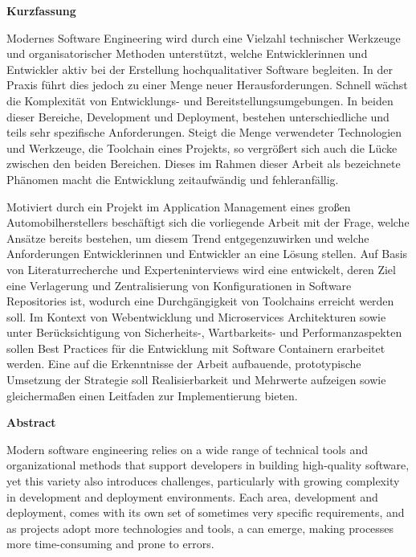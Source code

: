\clearpage

\begin{center}
    {\LARGE\textbf{Kurzfassung}}
\end{center}
\vspace{1em}

Modernes Software Engineering wird durch eine Vielzahl technischer Werkzeuge und organisatorischer Methoden unterstützt, welche Entwicklerinnen und Entwickler aktiv bei der Erstellung hochqualitativer Software begleiten. In der Praxis führt dies jedoch zu einer Menge neuer Herausforderungen. Schnell wächst die Komplexität von Entwicklungs- und Bereitstellungsumgebungen. In beiden dieser Bereiche, Development und Deployment, bestehen unterschiedliche und teils sehr spezifische Anforderungen. Steigt die Menge verwendeter Technologien und Werkzeuge, die Toolchain eines Projekts, so vergrößert sich auch die Lücke zwischen den beiden Bereichen. Dieses im Rahmen dieser Arbeit als  bezeichnete Phänomen macht die Entwicklung zeitaufwändig und fehleranfällig.

Motiviert durch ein Projekt im Application Management eines großen Automobilherstellers beschäftigt sich die vorliegende Arbeit mit der Frage, welche Ansätze bereits bestehen, um diesem Trend entgegenzuwirken und welche Anforderungen Entwicklerinnen und Entwickler an eine Lösung stellen. Auf Basis von Literaturrecherche und Experteninterviews wird eine  entwickelt, deren Ziel eine Verlagerung und Zentralisierung von Konfigurationen in Software Repositories ist, wodurch eine Durchgängigkeit von Toolchains erreicht werden soll. Im Kontext von Webentwicklung und Microservices Architekturen sowie unter Berücksichtigung von Sicherheits-, Wartbarkeits- und Performanzaspekten sollen Best Practices für die Entwicklung mit Software Containern erarbeitet werden. Eine auf die Erkenntnisse der Arbeit aufbauende, prototypische Umsetzung der Strategie soll Realisierbarkeit und Mehrwerte aufzeigen sowie gleichermaßen einen Leitfaden zur Implementierung bieten.

\vfil

\begin{center}
    {\LARGE\textbf{Abstract}}
\end{center}
\vspace{1em}

Modern software engineering relies on a wide range of technical tools and organizational methods that support developers in building high-quality software, yet this variety also introduces challenges, particularly with growing complexity in development and deployment environments. Each area, development and deployment, comes with its own set of sometimes very specific requirements, and as projects adopt more technologies and tools, a  can emerge, making processes more time-consuming and prone to errors.

